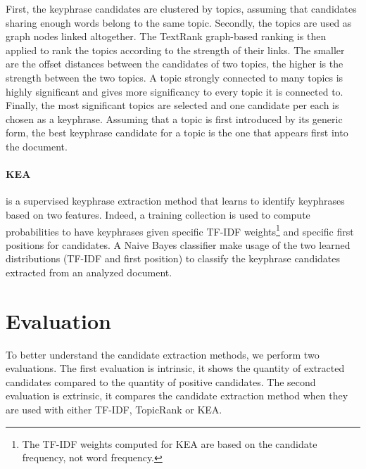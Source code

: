   First, the keyphrase candidates are clustered by topics, assuming that
  candidates sharing enough words belong to the same topic. Secondly, the
  topics are used as graph nodes linked altogether. The TextRank graph-based
  ranking is then applied to rank the topics according to the strength of their
  links. The smaller are the offset distances between the candidates of two
  topics, the higher is the strength between the two topics. A topic strongly
  connected to many topics is highly significant and gives more significancy to
  every topic it is connected to. Finally, the most significant topics are
  selected and one candidate per each is chosen as a keyphrase. Assuming that a
  topic is first introduced by its generic form, the best keyphrase candidate
  for a topic is the one that appears first into the document.

  \paragraph{KEA} is a supervised keyphrase extraction method that learns to
  identify keyphrases based on two features. Indeed, a training collection is
  used to compute probabilities to have keyphrases given specific TF-IDF
  weights\footnote{The TF-IDF weights computed for KEA are based on the
  candidate frequency, not word frequency.} and specific first positions for
  candidates. A Naive Bayes classifier make usage of the two learned
  distributions (TF-IDF and first position) to classify the keyphrase candidates
  extracted from an analyzed document.

\section{Evaluation}
\label{sec:evaluation}
  To better understand the candidate extraction methods, we perform two
  evaluations. The first evaluation is intrinsic, it shows the quantity of
  extracted candidates compared to the quantity of positive candidates. The
  second evaluation is extrinsic, it compares the candidate extraction method
  when they are used with either TF-IDF, TopicRank or KEA.

